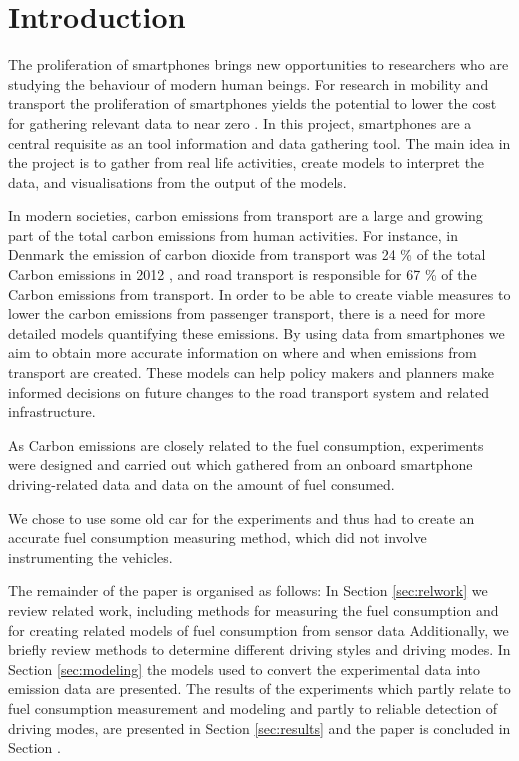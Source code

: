 \section{Introduction}

The proliferation of smartphones brings new opportunities to researchers who are studying the behaviour of modern human beings. For research in mobility and transport the proliferation of smartphones yields the potential to lower the cost for gathering relevant data to near zero \cite{Liu2013}.
In this project, smartphones are a central requisite as an tool information and data gathering tool. The main idea in the project is to gather from real life activities, create models to interpret the data, and visualisations from the output of the models. 

In modern societies, carbon emissions from transport are a large and growing part of the total carbon emissions from human activities. For instance, in Denmark the emission of carbon dioxide from transport was 24 \% of the total Carbon emissions in 2012 \cite{nielsen2014}, and road transport is responsible for 67 \% of the Carbon emissions from transport. In order to be able to create viable measures to lower the carbon emissions from passenger transport, there is a need for more detailed models quantifying these emissions. By using data from smartphones we aim to obtain more accurate information on where and when emissions from transport are created. These models can help policy makers and planners make informed decisions on future changes to the road transport system and related infrastructure.

As Carbon emissions are closely related to the fuel consumption, experiments were designed and carried out which gathered from an onboard smartphone  driving-related data and data on the amount of fuel consumed.

We chose to use some old car  for the experiments and thus 
 had to create an accurate fuel consumption measuring method, which did not involve instrumenting the vehicles. 


The remainder of the paper is organised as follows:
In Section \ref{sec:relwork} we review related work, including methods for measuring the fuel consumption and for creating related models of fuel consumption from sensor data  Additionally, we briefly review methods to determine different driving styles and driving modes.
In Section \ref{sec:modeling} the models used to convert the experimental data into emission data are presented. 
The results of the experiments which partly relate to fuel consumption measurement and modeling and partly to reliable detection of driving modes, are presented in Section \ref{sec:results} and the paper is concluded in Section \label{sec:conclusions}.